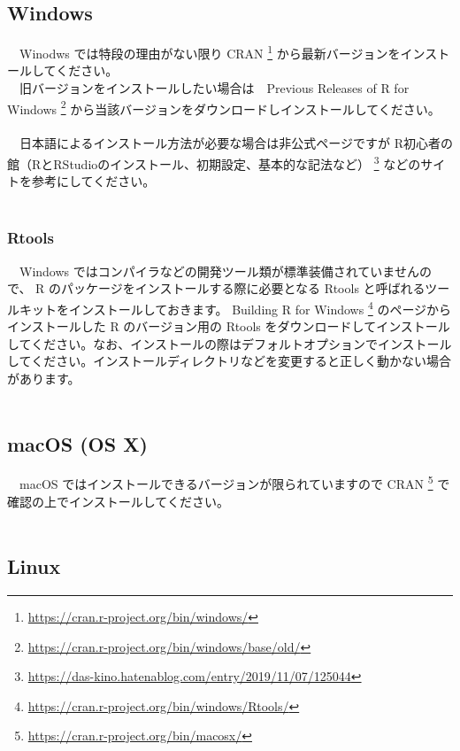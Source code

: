 \documentclass[
  12pt,
]{book}
\DeclareRobustCommand{\href}[2]{#2\footnote{\url{#1}}}
\begin{document}
\hypertarget{windows}{%
\subsection{Windows}\label{windows}}

　Winodws では特段の理由がない限り \href{https://cran.r-project.org/bin/windows/}{CRAN } から最新バージョンをインストールしてください。\\
　旧バージョンをインストールしたい場合は　\href{https://cran.r-project.org/bin/windows/base/old/}{Previous Releases of R for Windows } から当該バージョンをダウンロードしインストールしてください。\\
　\\
　日本語によるインストール方法が必要な場合は非公式ページですが \href{https://das-kino.hatenablog.com/entry/2019/11/07/125044}{R初心者の館（RとRStudioのインストール、初期設定、基本的な記法など） } などのサイトを参考にしてください。\\
　

\hypertarget{rtools}{%
\subsubsection{Rtools}\label{rtools}}

　Windows ではコンパイラなどの開発ツール類が標準装備されていませんので、 R のパッケージをインストールする際に必要となる Rtools と呼ばれるツールキットをインストールしておきます。 \href{https://cran.r-project.org/bin/windows/Rtools/}{Building R for Windows } のページからインストールした R のバージョン用の Rtools をダウンロードしてインストールしてください。なお、インストールの際はデフォルトオプションでインストールしてください。インストールディレクトリなどを変更すると正しく動かない場合があります。\\
　

\hypertarget{macos-os-x}{%
\subsection{macOS (OS X)}\label{macos-os-x}}

　macOS ではインストールできるバージョンが限られていますので \href{https://cran.r-project.org/bin/macosx/}{CRAN } で確認の上でインストールしてください。\\
　

\hypertarget{linux}{%
\subsection{Linux}\label{linux}}
\end{document}
